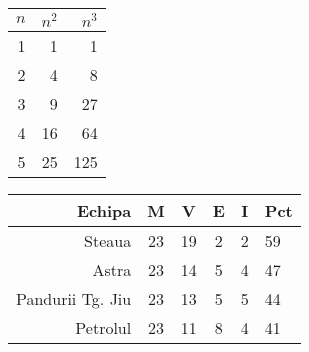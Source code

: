 \begin{tabular}{|r|r||r|} 
$n$ & $n^2$ & $n^3$ \\
\hline 1 & 1 & 1 \\
 2 & 4 & 8 \\
\hline
\hline 3 & 9 & 27 \\
4 & 16 & 64 \\
\hline 5 & 25 & 125 \\
\end{tabular}
\begin{tabular}{|r||*{4}{c}||l|} 
\hline 
Echipa & M & V & E & I & Pct \\ 
\hline
\hline Steaua & 23 & 19 & 2 & 2 & 59 \\ 
Astra & 23 & 14 & 5 & 4 & 47 \\ 
Pandurii Tg. Jiu & 23 & 13 & 5 & 5 & 44 \\ 
Petrolul & 23 & 11 & 8 & 4 & 41 \\ 
\hline 
\end{tabular}


